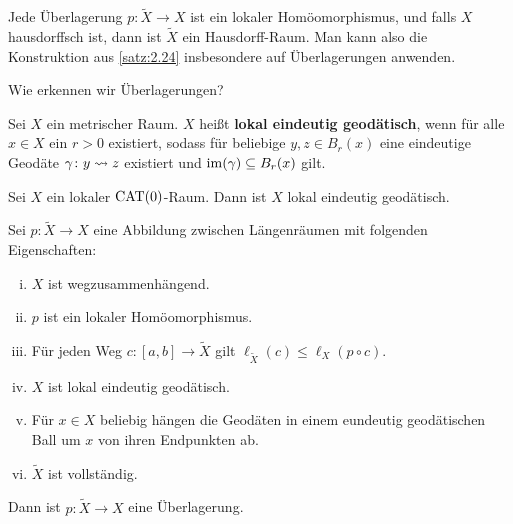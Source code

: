 \begin{bemerkung}
\label{bem:2.25}
	Jede Überlagerung $p\colon \tilde{X} \rightarrow X$ ist ein lokaler Homöomorphismus, und falls $X$ hausdorffsch ist, dann ist $\tilde{X}$ ein Hausdorff-Raum.
	Man kann also die Konstruktion aus \autoref{satz:2.24} insbesondere auf Überlagerungen anwenden.
\end{bemerkung}

Wie erkennen wir Überlagerungen?

\begin{definition}
\label{def:2.26}
	Sei $X$ ein metrischer Raum.
	$X$ heißt \textbf{lokal eindeutig geodätisch}, wenn für alle $x \in X$ ein $r > 0$ existiert, sodass für beliebige $y,z \in B_r(x)$ eine eindeutige Geodäte $\gamma \colon y \rightsquigarrow z$ existiert und $\operatorname{im}(\gamma) \subseteq B_r(x)$ gilt. 
\end{definition}

\begin{beispiel}
\label{bsp:2.27}
	Sei $X$ ein lokaler $\operatorname{CAT(0)}$-Raum.
	Dann ist $X$ lokal eindeutig geodätisch.
\end{beispiel}

\begin{satz}
\label{satz:2.28}
	Sei $p\colon \tilde{X} \rightarrow X$ eine Abbildung zwischen Längenräumen mit folgenden Eigenschaften:
	\begin{enumerate}[(i)]
		\item $X$ ist wegzusammenhängend.
		\item $p$ ist ein lokaler Homöomorphismus.
		\item Für jeden Weg $c \colon [a,b] \rightarrow \tilde{X}$ gilt $\ell_{\tilde{X}}(c) \leq \ell_X (p \circ c)$.
		\item $X$ ist lokal eindeutig geodätisch.
		\item Für $x \in X$ beliebig hängen die Geodäten in einem eundeutig geodätischen Ball um $x$ von ihren Endpunkten ab.
		\item $\tilde{X}$ ist vollständig.
	\end{enumerate}
	Dann ist $p \colon \tilde{X} \rightarrow X$ eine Überlagerung.
\end{satz}

